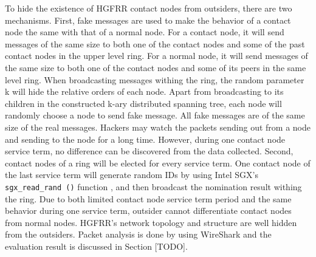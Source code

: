 To hide the existence of HGFRR contact nodes from outsiders, there are two mechanisms. First, fake messages are used to make the behavior of a contact node the same with that of a normal node. For a contact node, it will send messages of the same size to both one of the contact nodes and some of the past contact nodes in the upper level ring. For a normal node, it will send messages of the same size to both one of the contact nodes and some of its peers in the same level ring. When broadcasting messages withing the ring, the random parameter k will hide the relative orders of each node. Apart from broadcasting to its children in the constructed k-ary distributed spanning tree, each node will randomly choose a node to send fake message. All fake messages are of the same size of the real messages. Hackers may watch the packets sending out from a node and sending to the node for a long time. However, during one contact node service term, no difference can be discovered from the data collected. Second, contact nodes of a ring will be elected for every service term. One contact node of the last service term will generate random IDs by using Intel SGX's \texttt{sgx\_read\_rand ()} function \cite{costan2016intel}, and then broadcast the nomination result withing the ring. Due to both limited contact node service term period and the same behavior during one service term, outsider cannot differentiate contact nodes from normal nodes. HGFRR's network topology and structure are well hidden from the outsiders. Packet analysis is done by using WireShark and the evaluation result is discussed in Section [TODO].